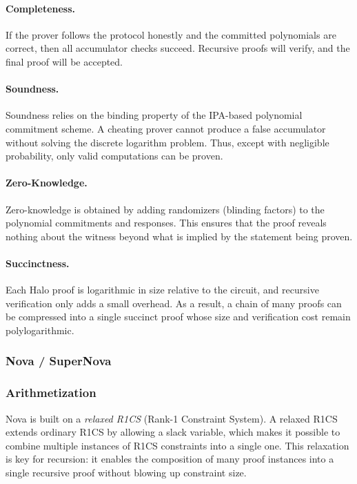 \paragraph{Completeness.}
If the prover follows the protocol honestly and the committed polynomials are correct, then all accumulator checks succeed. Recursive proofs will verify, and the final proof will be accepted.

\paragraph{Soundness.}
Soundness relies on the binding property of the IPA-based polynomial commitment scheme. A cheating prover cannot produce a false accumulator without solving the discrete logarithm problem. Thus, except with negligible probability, only valid computations can be proven.

\paragraph{Zero-Knowledge.}
Zero-knowledge is obtained by adding randomizers (blinding factors) to the polynomial commitments and responses. This ensures that the proof reveals nothing about the witness beyond what is implied by the statement being proven.

\paragraph{Succinctness.}
Each Halo proof is logarithmic in size relative to the circuit, and recursive verification only adds a small overhead. As a result, a chain of many proofs can be compressed into a single succinct proof whose size and verification cost remain polylogarithmic.

\subsubsection{Nova / SuperNova}

\subsubsection*{Arithmetization}

Nova is built on a \emph{relaxed R1CS} (Rank-1 Constraint System).  
A relaxed R1CS extends ordinary R1CS by allowing a slack variable, which makes it possible to combine multiple instances of R1CS constraints into a single one.  
This relaxation is key for recursion: it enables the composition of many proof instances into a single recursive proof without blowing up constraint size.  

